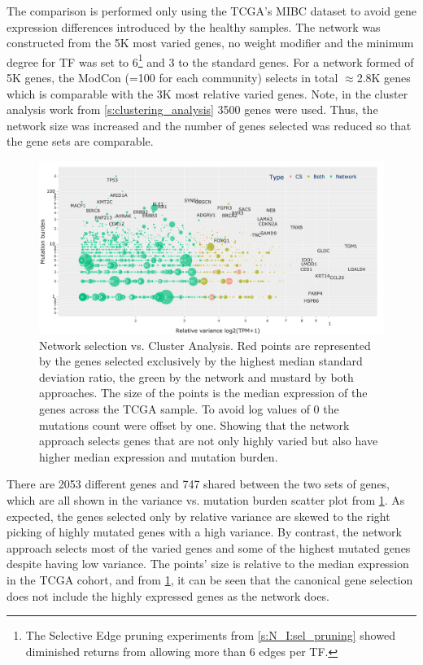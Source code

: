 The comparison is performed only using the TCGA's MIBC dataset to avoid gene expression differences introduced by the healthy samples. The network was constructed from the 5K most varied genes, no weight modifier and the minimum degree for TF  was set to 6\footnote{The Selective Edge pruning experiments from \cref{s:N_I:sel_pruning} showed diminished returns from allowing more than 6 edges per TF.} and 3 to the standard genes. For a network formed of 5K genes, the ModCon (=100 for each community) selects in total $\approx$2.8K genes which is comparable with the 3K most relative varied genes. Note, in the cluster analysis work from \cref{s:clustering_analysis} 3500 genes were used. Thus, the network size was increased and the number of genes selected was reduced so that the gene sets are comparable.

\begin{figure}[!t]    
    \centering\includegraphics[width=1.0\textwidth,keepaspectratio]{Sections/Network_I/Resources/Tum_network/ClusteringAnalysis_vs_Network_3.png}
    \caption[Gene selection: network vs cluster analysis]{Network selection vs. Cluster Analysis. Red points are represented by the genes selected exclusively by the highest median standard deviation ratio, the green by the network and mustard by both approaches. The size of the points is the median expression of the genes across the TCGA sample. To avoid log values of 0 the mutations count were offset by one. Showing that the network approach selects genes that are not only highly varied but also have higher median expression and mutation burden.}
    \label{fig:N_I:network_ca_selection}
\end{figure}

There are 2053 different genes and 747 shared between the two sets of genes, which are all shown in the variance vs. mutation burden scatter plot from \cref{fig:N_I:network_ca_selection}. As expected, the genes selected only by relative variance are skewed to the right picking of highly mutated genes with a high variance. By contrast, the network approach selects most of the varied genes and some of the highest mutated genes despite having low variance. The points' size is relative to the median expression in the TCGA cohort, and from   \cref{fig:N_I:network_ca_selection}, it can be seen that the canonical gene selection does not include the highly expressed genes as the network does.

